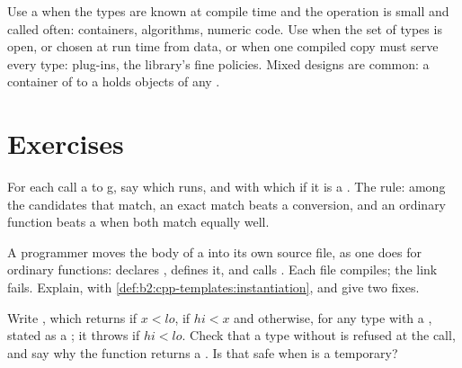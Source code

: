 \begin{inpractice}
Use a  when the types are known at compile time and the operation is small and called often: containers,
algorithms, numeric code. Use  when the set of types is open, or chosen at run time from data, or
when one compiled copy must serve every type: plug-ins, the library's fine policies. Mixed designs are common: a
 container of  to a  holds objects of any .
\end{inpractice}

\section{Exercises}\label{sec:b2:cpp-templates:exercises}

\begin{exercise}[$\star$]\label{exo:b2:cpp-templates:1}
For each call a to g, say which  runs, and with which  if it is a . The rule: among the
candidates that match, an exact match beats a conversion, and an ordinary function beats a  when both match
equally well.
\end{exercise}

\begin{exercise}[$\star$]\label{exo:b2:cpp-templates:2}
A programmer moves the body of a  into its own source file, as one does for ordinary functions:
 declares ,  defines it, and
 calls . Each file compiles; the link fails. Explain, with
\cref{def:b2:cpp-templates:instantiation}, and give two fixes.
\end{exercise}

\begin{exercise}[$\star$]\label{exo:b2:cpp-templates:3}
Write , which returns  if $x < lo$,  if $hi < x$ and  otherwise,
for any type with a \code{<}, stated as a ; it throws if $hi < lo$. Check that a type without \code{<} is
refused at the call, and say why the function returns a . Is that safe when  is a
temporary?
\end{exercise}

